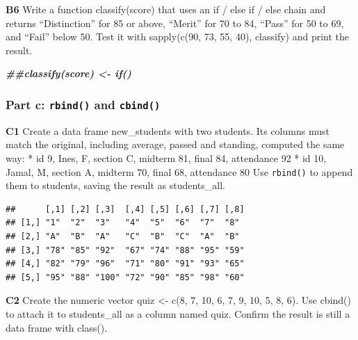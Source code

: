 \documentclass[
]{article}
\newenvironment{Shaded}{\begin{snugshade}}{\end{snugshade}}
\newcommand{\DocumentationTok}[1]{\textcolor[rgb]{0.56,0.35,0.01}{\textbf{\textit{#1}}}}
\newcommand{\FunctionTok}[1]{\textcolor[rgb]{0.13,0.29,0.53}{\textbf{#1}}}
\newcommand{\NormalTok}[1]{#1}
\newcommand{\OtherTok}[1]{\textcolor[rgb]{0.56,0.35,0.01}{#1}}
\newcommand{\SpecialCharTok}[1]{\textcolor[rgb]{0.81,0.36,0.00}{\textbf{#1}}}
\begin{document}
\textbf{B6} Write a function classify(score) that uses an if / else if /
else chain and returns ``Distinction'' for 85 or above, ``Merit'' for 70
to 84, ``Pass'' for 50 to 69, and ``Fail'' below 50. Test it with
sapply(c(90, 73, 55, 40), classify) and print the result.

\begin{Shaded}
\begin{Highlighting}[]
\DocumentationTok{\#\#classify(score) \textless{}{-} if()}
\end{Highlighting}
\end{Shaded}

\subsubsection{\texorpdfstring{Part c: \texttt{rbind()} and
\texttt{cbind()}}{Part c: rbind() and cbind()}}\label{part-c-rbind-and-cbind}

\textbf{C1} Create a data frame new\_students with two students. Its
columns must match the original, including average, passed and standing,
computed the same way: * id 9, Ines, F, section C, midterm 81, final 84,
attendance 92 * id 10, Jamal, M, section A, midterm 70, final 68,
attendance 80 Use \texttt{rbind()} to append them to students, saving
the result as students\_all.

\begin{Shaded}
\end{Shaded}

\begin{verbatim}
##      [,1] [,2] [,3]  [,4] [,5] [,6] [,7] [,8]
## [1,] "1"  "2"  "3"   "4"  "5"  "6"  "7"  "8" 
## [2,] "A"  "B"  "A"   "C"  "B"  "C"  "A"  "B" 
## [3,] "78" "85" "92"  "67" "74" "88" "95" "59"
## [4,] "82" "79" "96"  "71" "80" "91" "93" "65"
## [5,] "95" "88" "100" "72" "90" "85" "98" "60"
\end{verbatim}

\textbf{C2} Create the numeric vector quiz \textless- c(8, 7, 10, 6, 7,
9, 10, 5, 8, 6). Use cbind() to attach it to students\_all as a column
named quiz. Confirm the result is still a data frame with class().
\end{document}
